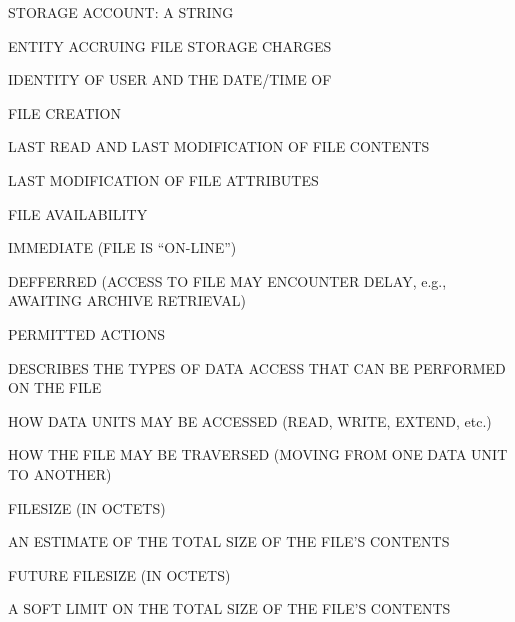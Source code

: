 \begin{bwslide}

\begin{nrtc}
\item	STORAGE ACCOUNT: A STRING
    \begin{nrtc}
    \item	ENTITY ACCRUING FILE STORAGE CHARGES
    \end{nrtc}	

\item	IDENTITY OF USER AND THE DATE/TIME OF
    \begin{nrtc}
    \item	FILE CREATION

    \item	LAST READ AND LAST MODIFICATION OF FILE CONTENTS

    \item	LAST MODIFICATION OF FILE ATTRIBUTES
    \end{nrtc}

\item	FILE AVAILABILITY
    \begin{nrtc}
    \item	IMMEDIATE (FILE IS ``ON-LINE'')

    \item	DEFFERRED (ACCESS TO FILE MAY ENCOUNTER DELAY,
		e.g., AWAITING ARCHIVE RETRIEVAL)
    \end{nrtc}
\end{nrtc}
\end{bwslide}


\begin{bwslide}

\begin{nrtc}
\item	PERMITTED ACTIONS
    \begin{nrtc}
    \item	DESCRIBES THE TYPES OF DATA ACCESS THAT CAN BE PERFORMED ON
		THE FILE

    \item	HOW DATA UNITS MAY BE ACCESSED
		(READ, WRITE, EXTEND, etc.)

    \item	HOW THE FILE MAY BE TRAVERSED
		(MOVING FROM ONE DATA UNIT TO ANOTHER)
    \end{nrtc}

\item	FILESIZE (IN OCTETS)
    \begin{nrtc}
    \item	AN ESTIMATE OF THE TOTAL SIZE OF THE FILE'S CONTENTS
    \end{nrtc}
	

\item	FUTURE FILESIZE (IN OCTETS)
    \begin{nrtc}
    \item	A SOFT LIMIT ON THE TOTAL SIZE OF THE FILE'S CONTENTS
    \end{nrtc}
\end{nrtc}
\end{bwslide}


